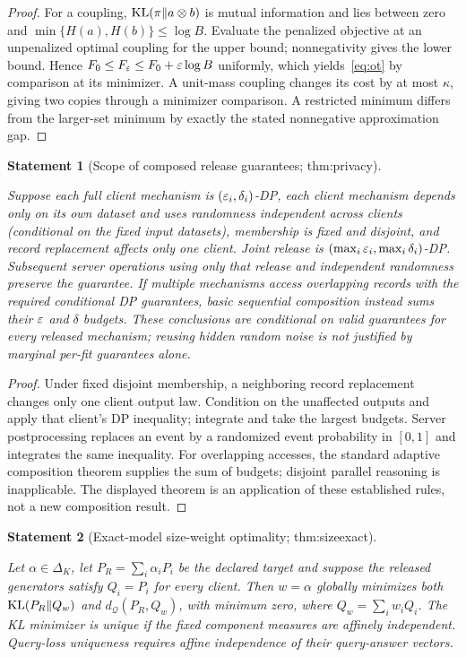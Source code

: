 \documentclass[11pt]{article}
\newtheorem{statement}{Statement}
\newcommand{\Q}{\mathcal Q}\newcommand{\Z}{\mathcal Z}\newcommand{\W}{\mathcal W}
\begin{document}
\begin{proof}
For a coupling, $\operatorname{KL}(\pi\|a\otimes b)$ is mutual information and lies between zero and $\min\{H(a),H(b)\}\le\log B$. Evaluate the penalized objective at an unpenalized optimal coupling for the upper bound; nonnegativity gives the lower bound. Hence $F_0\le F_\varepsilon\le F_0+\varepsilon\log B$ uniformly, which yields~\eqref{eq:ot} by comparison at its minimizer. A unit-mass coupling changes its cost by at most $\kappa$, giving two copies through a minimizer comparison. A restricted minimum differs from the larger-set minimum by exactly the stated nonnegative approximation gap.
\end{proof}

\begin{statement}[Scope of composed release guarantees; thm:privacy]\label{thm:privacy}

Suppose each full client mechanism is $(\varepsilon_i,\delta_i)$-DP, each client mechanism depends only on its own dataset and uses randomness independent across clients (conditional on the fixed input datasets), membership is fixed and disjoint, and record replacement affects only one client. Joint release is $(\max_i\varepsilon_i,\max_i\delta_i)$-DP. Subsequent server operations using only that release and independent randomness preserve the guarantee. If multiple mechanisms access overlapping records with the required conditional DP guarantees, basic sequential composition instead sums their $\varepsilon$ and $\delta$ budgets. These conclusions are conditional on valid guarantees for every released mechanism; reusing hidden random noise is not justified by marginal per-fit guarantees alone.

\end{statement}

\begin{proof}
Under fixed disjoint membership, a neighboring record replacement changes only one client output law. Condition on the unaffected outputs and apply that client's DP inequality; integrate and take the largest budgets. Server postprocessing replaces an event by a randomized event probability in $[0,1]$ and integrates the same inequality. For overlapping accesses, the standard adaptive composition theorem supplies the sum of budgets; disjoint parallel reasoning is inapplicable. The displayed theorem is an application of these established rules, not a new composition result.
\end{proof}

\begin{statement}[Exact-model size-weight optimality; thm:sizeexact]\label{thm:sizeexact}

Let $\alpha\in\Delta_K$, let $P_R=\sum_i\alpha_iP_i$ be the declared target and suppose the released generators satisfy $Q_i=P_i$ for every client. Then $w=\alpha$ globally minimizes both $\operatorname{KL}(P_R\|Q_w)$ and $d_\Q(P_R,Q_w)$, with minimum zero, where $Q_w=\sum_iw_iQ_i$. The KL minimizer is unique if the fixed component measures are affinely independent. Query-loss uniqueness requires affine independence of their query-answer vectors.

\end{statement}
\end{document}
